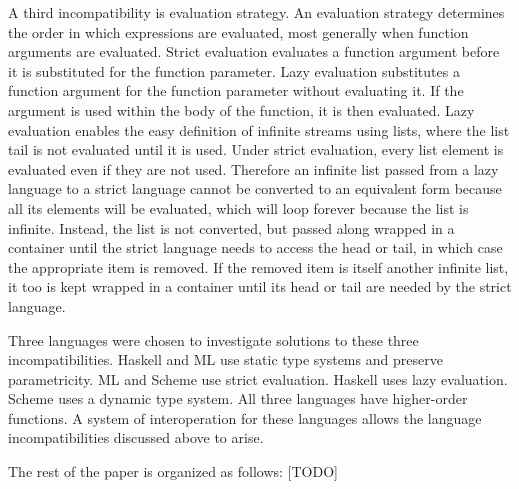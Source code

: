 A third incompatibility is evaluation strategy.  An evaluation strategy determines the order in which expressions are evaluated, most generally when function arguments are evaluated.  Strict evaluation evaluates a function argument before it is substituted for the function parameter.  Lazy evaluation substitutes a function argument for the function parameter without evaluating it.  If the argument is used within the body of the function, it is then evaluated.  Lazy evaluation enables the easy definition of infinite streams using lists, where the list tail is not evaluated until it is used.  Under strict evaluation, every list element is evaluated even if they are not used.  Therefore an infinite list passed from a lazy language to a strict language cannot be converted to an equivalent form because all its elements will be evaluated, which will loop forever because the list is infinite.  Instead, the list is not converted, but passed along wrapped in a container until the strict language needs to access the head or tail, in which case the appropriate item is removed.  If the removed item is itself another infinite list, it too is kept wrapped in a container until its head or tail are needed by the strict language.

Three languages were chosen to investigate solutions to these three incompatibilities.  Haskell and ML use static type systems and preserve parametricity.  ML and Scheme use strict evaluation.  Haskell uses lazy evaluation.  Scheme uses a dynamic type system.  All three languages have higher-order functions.  A system of interoperation for these languages allows the language incompatibilities discussed above to arise.  

The rest of the paper is organized as follows: [TODO]